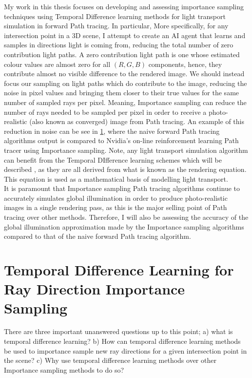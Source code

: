 \documentclass[ %
                    author={Callum Pearce},
                supervisor={Dr. Neill Campbell},
                    degree={MEng},
                     title={How effective are Temporal difference learning methods for reducing the number of zero contribution light paths while still accurately approximating Global Illumination in Path tracing?},
                  subtitle={},
                      type={research},
                      year={2019} ]{dissertation}
\begin{document}
My work in this thesis focuses on developing and assessing importance sampling 
techniques using Temporal Difference learning methods for light transport simulation 
in forward Path tracing. In particular, More specifically,
for any intersection point in a 3D scene, I attempt to create an AI agent that learns 
and samples in  directions light is coming from, reducing the total number of 
zero contribution light paths. A zero contribution light path is one whose 
estimated colour values are almost zero for all $(R,G,B)$ components, hence,
they contribute almost no visible difference to the rendered image. We should 
instead focus our sampling on light paths which do contribute to the image,
reducing the noise in pixel values and bringing them closer to their true 
values for the same number of sampled rays per pixel. Meaning, Importance 
sampling can reduce the number of rays needed to be sampled per pixel in 
order to receive a photo-realistic (also known as converged) image from Path 
tracing. An example of this reduction in noise can be see in \ref{}, where the 
naive forward Path tracing algorithms output is compared to Nvidia's on-line
reinforcement learning Path tracer using Importance sampling. Note, any 
light transport simulation algorithm can benefit from the Temporal DIfference learning
schemes which will be described \cite{jensen1996global, keller2016path}, 
as they are all derived from what is known as the rendering equation. This equation
is used as a mathematical basis of modelling light transport.\\


It is paramount that Importance sampling Path tracing algorithms continue to accurately
simulates global illumination in order to produce photo-realistic images in a single
rendering pass, as this is the major selling point of Path tracing over other 
methods. Therefore, I will also be assessing the accuracy of the global
illumination approximation made by the Importance sampling algorithms compared
to that of the naive forward Path tracing algorithm.

\section{Temporal Difference Learning for Ray Direction Importance Sampling}

There are three important unanswered questions up to this point; a) what is temporal
difference learning?  b) How can temporal difference learning methods be 
used to importance sample new ray directions for a given intersection point in 
the scene? c) Why use temporal difference learning methods over other Importance 
sampling methods to do so? 
\end{document}

